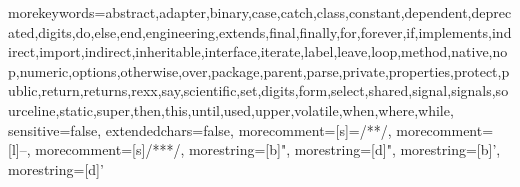 
{morekeywords={abstract,adapter,binary,case,catch,class,constant,dependent,deprecated,digits,do,else,end,engineering,extends,final,finally,for,forever,if,implements,indirect,import,indirect,inheritable,interface,iterate,label,leave,loop,method,native,nop,numeric,options,otherwise,over,package,parent,parse,private,properties,protect,public,return,returns,rexx,say,scientific,set,digits,form,select,shared,signal,signals,sourceline,static,super,then,this,until,used,upper,volatile,when,where,while},
sensitive=false,
extendedchars=false,
morecomment=[s]={/*}{*/},
morecomment=[l]{--},
morecomment=[s]{/**}{*/},
morestring=[b]",
morestring=[d]",
morestring=[b]',
morestring=[d]'}

